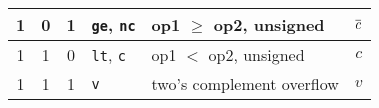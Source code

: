 \documentclass[architecture]{compas2018}
\begin{document}
\begin{table}
\begin{center}
\begin{tabular}{|c|c|c||l||l|c|}
    \hline
    1 & 0 & 1 & \texttt{ge}, \texttt{nc}  & op1 $\ge$ op2, unsigned                            & $\overline{c}$                                                                       \\
    \hline
    1 & 1 & 0 & \texttt{lt}, \texttt{c}   & op1 $<$ op2, unsigned                              & $c$                                                                                 \\
    \hline
    1 & 1 & 1 & {\texttt{v}}              & {two's complement overflow}                        & {$v$}                                                                               \\
    \hline
  \end{tabular}
\end{center}
\end{table} 
\end{document}
